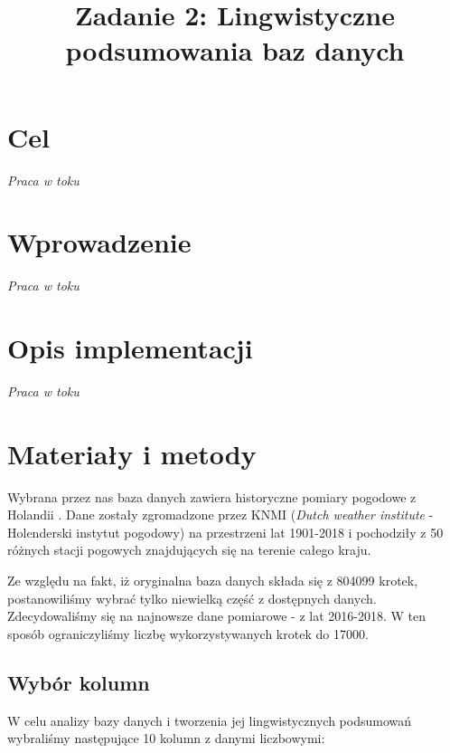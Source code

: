 \documentclass{classrep}
\author{
\studentinfo{Mateusz Walczak}{216911} \and
\studentinfo{Konrad Kajszczak}{216790}
}
\title{Zadanie 2: Lingwistyczne podsumowania baz danych}
\begin{document}
\maketitle

\section{Cel}
\textit{Praca w toku}


\section{Wprowadzenie}
\textit{Praca w toku}


\section{Opis implementacji}
\textit{Praca w toku}


\section{Materiały i metody}
Wybrana przez nas baza danych zawiera historyczne pomiary pogodowe z Holandii \cite{baza}. Dane zostały zgromadzone przez KNMI (\textit{Dutch weather institute} - Holenderski instytut pogodowy) na przestrzeni lat 1901-2018 i pochodziły z 50 różnych stacji pogowych znajdujących się na terenie całego kraju.\newline

Ze względu na fakt, iż oryginalna baza danych składa się z 804099 krotek, postanowiliśmy wybrać tylko niewielką część z dostępnych danych. Zdecydowaliśmy się na najnowsze dane pomiarowe - z lat 2016-2018. W ten sposób ograniczyliśmy liczbę wykorzystywanych krotek do 17000.\newline

\subsection{Wybór kolumn}
W celu analizy bazy danych i tworzenia jej lingwistycznych podsumowań wybraliśmy następujące 10 kolumn z danymi liczbowymi:
\end{document}
